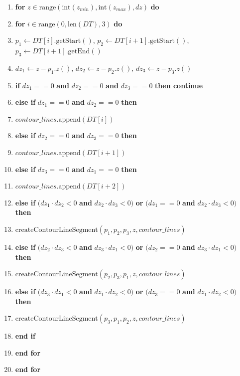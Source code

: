 \documentclass[12pt]{article}
\begin{document}
\begin{enumerate}
    \item \textbf{for} $z \in \text{range}(\text{int}(z_{min}), \text{int}(z_{max}), dz)$ \textbf{do}
    \item \quad \textbf{for} $i \in \text{range}(0, \text{len}(DT), 3)$ \textbf{do}
    \item \quad \quad $p_1 \leftarrow DT[i].\text{getStart}()$, $p_2 \leftarrow DT[i+1].\text{getStart}()$, $p_3 \leftarrow DT[i+1].\text{getEnd}()$
    \item \quad \quad $dz_1 \leftarrow z - p_1.z()$, $dz_2 \leftarrow z - p_2.z()$, $dz_3 \leftarrow z - p_3.z()$
    \item \quad \quad \textbf{if} $dz_1 == 0$ \textbf{and} $dz_2 == 0$ \textbf{and} $dz_3 == 0$ \textbf{then continue}
    \item \quad \quad \textbf{else if} $dz_1 == 0$ \textbf{and} $dz_2 == 0$ \textbf{then}
    \item \quad \quad \quad $contour\_lines.\text{append}(DT[i])$
    \item \quad \quad \textbf{else if} $dz_2 == 0$ \textbf{and} $dz_3 == 0$ \textbf{then}
    \item \quad \quad \quad $contour\_lines.\text{append}(DT[i+1])$
    \item \quad \quad \textbf{else if} $dz_3 == 0$ \textbf{and} $dz_1 == 0$ \textbf{then}
    \item \quad \quad \quad $contour\_lines.\text{append}(DT[i+2])$
    \item \quad \quad \textbf{else if} $(dz_1 \cdot dz_2 < 0$ \textbf{and} $dz_2 \cdot dz_3 < 0)$ \textbf{or} $(dz_1 == 0$ \textbf{and} $dz_2 \cdot dz_3 < 0)$ \textbf{then}
    \item \quad \quad \quad $\text{createContourLineSegment}(p_1, p_2, p_3, z, contour\_lines)$
    \item \quad \quad \textbf{else if} $(dz_2 \cdot dz_3 < 0$ \textbf{and} $dz_3 \cdot dz_1 < 0)$ \textbf{or} $(dz_2 == 0$ \textbf{and} $dz_3 \cdot dz_1 < 0)$ \textbf{then}
    \item \quad \quad \quad $\text{createContourLineSegment}(p_2, p_3, p_1, z, contour\_lines)$
    \item \quad \quad \textbf{else if} $(dz_3 \cdot dz_1 < 0$ \textbf{and} $dz_1 \cdot dz_2 < 0)$ \textbf{or} $(dz_3 == 0$ \textbf{and} $dz_1 \cdot dz_2 < 0)$ \textbf{then}
    \item \quad \quad \quad $\text{createContourLineSegment}(p_3, p_1, p_2, z, contour\_lines)$
    \item \quad \quad \textbf{end if}
    \item \quad \textbf{end for}
    \item \textbf{end for}
\end{enumerate}
\end{document}
